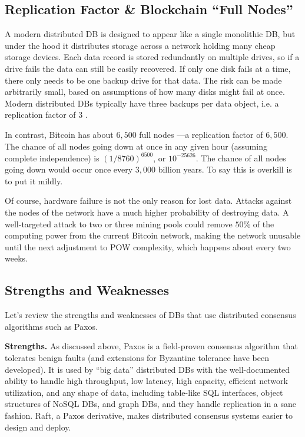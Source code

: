 \subsection{Replication Factor \& Blockchain “Full Nodes”}
A modern distributed DB is designed to appear like a single monolithic DB, but under the hood it distributes storage across a network holding many cheap storage devices.
Each data record is stored redundantly on multiple drives, so if a drive fails the data can still be easily recovered.
If only one disk fails at a time, there only needs to be one backup drive for that data.
The risk can be made arbitrarily small, based on assumptions of how many disks might fail at once.
Modern distributed DBs typically have three backups per data object, i.e. a replication factor of $3$ \cite{wiki_raid}.

In contrast, Bitcoin has about $6,500$ full nodes \cite{bitcoin2015fees}—a replication factor of $6,500$.
The chance of all nodes going down at once in any given hour (assuming complete independence) is $(1/8760)^{6500}$, or $10^{-25626}$.
The chance of all nodes going down would occur once every $3,000$ billion years. To say this is overkill is to put it mildly.

Of course, hardware failure is not the only reason for lost data.
Attacks against the nodes of the network have a much higher probability of destroying data.
A well-targeted attack to two or three mining pools could remove $50\%$ of the computing power from the current Bitcoin network, making the network unusable until the next adjustment to POW complexity, which happens about every two weeks.

\subsection{Strengths and Weaknesses}
Let’s review the strengths and weaknesses of DBs that use distributed consensus algorithms such as Paxos.

\medskip
\noindent\textbf{Strengths.} As discussed above, Paxos is a field-proven consensus algorithm that tolerates benign faults (and extensions for Byzantine tolerance have been developed).
It is used by “big data” distributed DBs with the well-documented ability to handle high throughput, low latency, high capacity, efficient network utilization, and any shape of data, including table-like SQL interfaces, object structures of NoSQL DBs, and graph DBs, and they handle replication in a sane fashion.
Raft, a Paxos derivative, makes distributed consensus systems easier to design and deploy.

